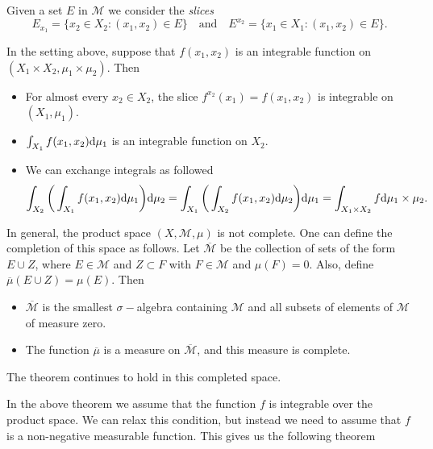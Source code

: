 Given a set $E$ in $\mathcal{M}$ we consider the \textit{slices}
\begin{equation}
    E_{x_1} = \{ x_2 \in X_2: (x_1, x_2) \in E \} \quad \text{and} \quad E^{x_2} = \{ x_1 \in X_1: (x_1, x_2) \in E \}.
\end{equation}

\begin{theorem} \label{thm:Fubini_Theorem}
In the setting above, suppose that $f(x_1, x_2)$ is an integrable function on $(X_1 \times X_2, \mu_1 \times \mu_2)$. Then
\begin{itemize}
\item For almost every $x_2 \in X_2$, the slice $f^{x_2}(x_1) = f(x_1, x_2)$ is integrable on $(X_1, \mu_1)$. 
\item $\int_{X_1} f(x_1, x_2) \mathrm{d} \mu_1$ is an integrable function on $X_2$.
\item We can exchange integrals as followed
\begin{equation} 
\int_{X_2} \bigg(\int_{X_1} f(x_1, x_2) \mathrm{d} \mu_1 \bigg) \mathrm{d} \mu_2 = \int_{X_1} \bigg(\int_{X_2} f(x_1, x_2) \mathrm{d} \mu_2 \bigg) \mathrm{d} \mu_1 = \int_{X_1 \times X_2} f \mathrm{d} \mu_1 \times \mu_2.
\end{equation}
\end{itemize}
\end{theorem}
\begin{remark}
In general, the product space $(X, \mathcal{M}, \mu)$ is not complete. One can define the completion of this space as follows. Let $\overline{\mathcal{M}}$ be the collection of sets of the form $E \cup Z$, where $E \in \mathcal{M}$ and $Z \subset F$ with $F \in \mathcal{M}$ and $\mu (F) = 0$. Also, define $\overline{\mu}(E \cup Z) = \mu (E)$. Then 
\begin{itemize}
    \item $\overline{\mathcal{M}}$ is the smallest $\sigma-$algebra containing $\mathcal{M}$ and all subsets of elements of $\mathcal{M}$ of measure zero.
    \item The function $\overline{\mu}$ is a measure on $\overline{\mathcal{M}}$, and this measure is complete.
\end{itemize}
The theorem continues to hold in this completed space.
\end{remark}
In the above theorem we assume that the function $f$ is integrable over the product space. We can relax this condition, but instead we need to assume that $f$ is a non-negative measurable function. This gives us the following theorem

